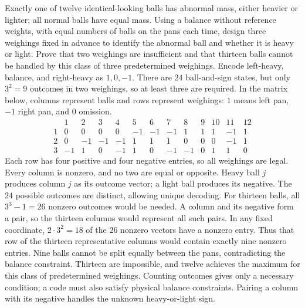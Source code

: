 Exactly one of twelve identical-looking balls has abnormal mass, either heavier or lighter; all normal balls have equal mass. Using a balance without reference weights, with equal numbers of balls on the pans each time, design three weighings fixed in advance to identify the abnormal ball and whether it is heavy or light. Prove that two weighings are insufficient and that thirteen balls cannot be handled by this class of three predetermined weighings.
\solution Encode left-heavy, balance, and right-heavy as $1,0,-1$. There are $24$ ball-and-sign states, but only $3^2=9$ outcomes in two weighings, so at least three are required.
In the matrix below, columns represent balls and rows represent weighings: $1$ means left pan, $-1$ right pan, and $0$ omission.
\[
 \begin{array}{c|rrrrrrrrrrrr}
 &1&2&3&4&5&6&7&8&9&10&11&12\\\hline
 1&0&0&0&0&-1&-1&-1&1&1&1&-1&1\\
 2&0&-1&-1&-1&1&1&1&0&0&0&-1&1\\
 3&-1&1&0&-1&1&0&-1&-1&0&1&1&0
 \end{array}
\]
Each row has four positive and four negative entries, so all weighings are legal. Every column is nonzero, and no two are equal or opposite. Heavy ball $j$ produces column $j$ as its outcome vector; a light ball produces its negative. The $24$ possible outcomes are distinct, allowing unique decoding.
For thirteen balls, all $3^3-1=26$ nonzero outcomes would be needed. A column and its negative form a pair, so the thirteen columns would represent all such pairs. In any fixed coordinate, $2\cdot3^2=18$ of the $26$ nonzero vectors have a nonzero entry. Thus that row of the thirteen representative columns would contain exactly nine nonzero entries. Nine balls cannot be split equally between the pans, contradicting the balance constraint. Thirteen are impossible, and twelve achieves the maximum for this class of predetermined weighings.
\insight Counting outcomes gives only a necessary condition; a code must also satisfy physical balance constraints. Pairing a column with its negative handles the unknown heavy-or-light sign.
